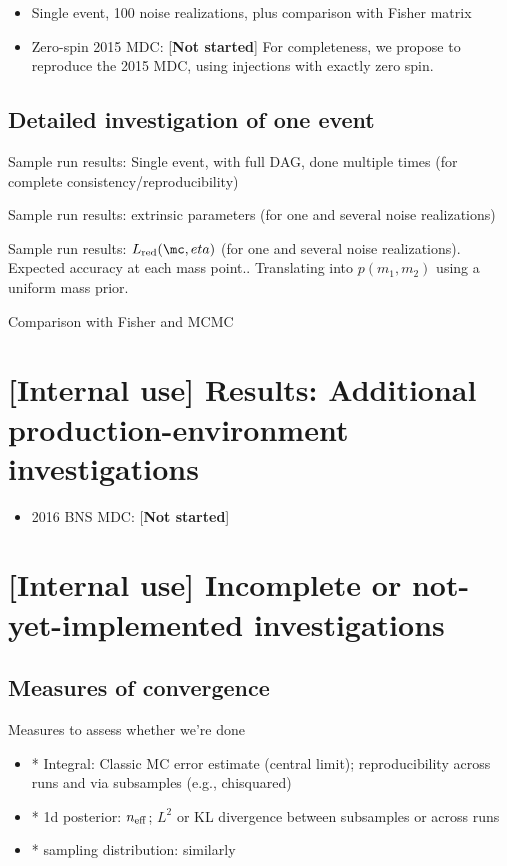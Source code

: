 \begin{itemize}
\item Single event, 100 noise realizations, plus comparison with Fisher matrix

\item Zero-spin 2015 MDC: [\textbf{Not started}]  For completeness, we propose to reproduce the 2015 MDC,  using
  injections with exactly zero spin.

\end{itemize}

\subsection{Detailed investigation of one event}
Sample run results: Single event, with full DAG, done multiple times (for complete consistency/reproducibility)

Sample run results: extrinsic parameters (for one and several noise realizations)

Sample run results: $L_{\rm red}(\mc,eta)$ (for one and several noise realizations). Expected accuracy at each mass
point.. Translating into  $p(m_1,m_2)$ using a uniform mass prior.

Comparison with Fisher and MCMC



\section{[Internal use] Results: Additional production-environment investigations}

\begin{itemize}
\item 2016 BNS MDC: [\textbf{Not started}]

\end{itemize}

\section{[Internal use] Incomplete or not-yet-implemented investigations}

\subsection{Measures of convergence}

Measures to assess whether we're done
\begin{itemize}
\item * Integral: Classic MC error estimate (central limit); reproducibility across runs and via subsamples (e.g., chisquared)

\item * 1d posterior:  $n_{\rm eff}$; $L^2$ or KL divergence between subsamples or across runs

\item * sampling distribution: similarly
\end{itemize}


